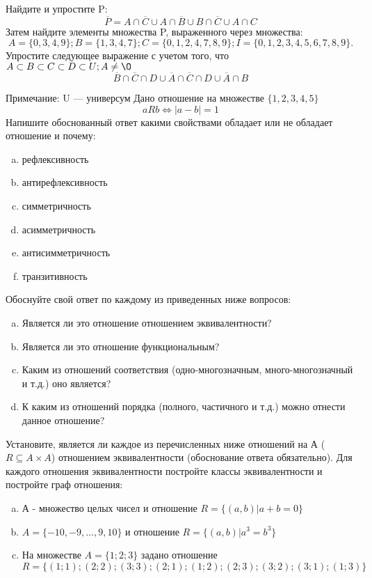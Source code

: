 \documentclass[10pt]{exam}
\begin{document}
\begin{questions}
\question
Найдите и упростите P:
\begin{equation*}
\overline{P} = A \cap \overline{C} \cup A \cap \overline{B} \cup B \cap \overline{C} \cup A \cap C
\end{equation*}
Затем найдите элементы множества P, выраженного через множества:
\begin{equation*}
A = \{0, 3, 4, 9\}; 
B = \{1, 3, 4, 7\};
C = \{0, 1, 2, 4, 7, 8, 9\};
I = \{0, 1, 2, 3, 4, 5, 6, 7, 8, 9\}.
\end{equation*}\question
Упростите следующее выражение с учетом того, что $A\subset B \subset C \subset D \subset U; A \neq \O$
\begin{equation*}
\overline{B} \cap \overline{C} \cap D \cup \overline{A} \cap \overline{C} \cap D \cup \overline{A} \cap B
\end{equation*}

Примечание: U — универсум\question
Дано отношение на множестве $\{1, 2, 3, 4, 5\}$ 
\begin{equation*}
aRb \iff |a-b| = 1
\end{equation*}
Напишите обоснованный ответ какими свойствами обладает или не обладает отношение и почему:   
\begin{enumerate} [a)]\setcounter{enumi}{0}
\item рефлексивность
\item антирефлексивность
\item симметричность
\item асимметричность
\item антисимметричность
\item транзитивность
\end{enumerate}

Обоснуйте свой ответ по каждому из приведенных ниже вопросов:
\begin{enumerate} [a)]\setcounter{enumi}{0}
    \item Является ли это отношение отношением эквивалентности?
    \item Является ли это отношение функциональным?
    \item Каким из отношений соответствия (одно-многозначным, много-многозначный и т.д.) оно является?
    \item К каким из отношений порядка (полного, частичного и т.д.) можно отнести данное отношение?
\end{enumerate}

\question
Установите, является ли каждое из перечисленных ниже отношений на А ($R \subseteq A \times A$) отношением эквивалентности (обоснование ответа обязательно). Для каждого отношения эквивалентности 
постройте классы эквивалентности и постройте граф отношения:
\begin{enumerate}[a)]\setcounter{enumi}{0}
\item А - множество целых чисел и отношение $R = \{(a,b)|a + b = 0\}$
\item $A = \{-10, -9, …, 9, 10\}$ и отношение $R = \{(a,b)|a^{3} = b^{3}\}$
\item На множестве $A = \{1; 2; 3\}$ задано отношение $R = \{(1; 1); (2; 2); (3; 3); (2; 1); (1; 2); (2; 3); (3; 2); (3; 1); (1; 3)\}$


\end{enumerate}
\end{questions}
\end{document}

